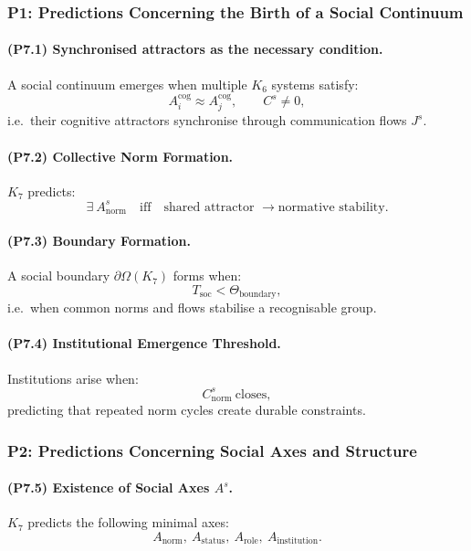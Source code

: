 \subsubsection{P1: Predictions Concerning the Birth of a Social Continuum}

\paragraph{(P7.1) Synchronised attractors as the necessary condition.}
A social continuum emerges when multiple $K_6$ systems satisfy:
\[
A_i^{\mathrm{cog}} \approx A_j^{\mathrm{cog}},
\qquad
C^s \neq 0,
\]
i.e.\ their cognitive attractors synchronise through communication flows $J^s$.

\paragraph{(P7.2) Collective Norm Formation.}
$K_7$ predicts:
\[
\exists \ A_{\mathrm{norm}}^s \quad \text{iff} \quad
\text{shared attractor } \to \text{normative stability}.
\]

\paragraph{(P7.3) Boundary Formation.}
A social boundary $\partial\Omega(K_7)$ forms when:
\[
T_{\mathrm{soc}} < \Theta_{\mathrm{boundary}},
\]
i.e.\ when common norms and flows stabilise a recognisable group.

\paragraph{(P7.4) Institutional Emergence Threshold.}
Institutions arise when:
\[
C_{\mathrm{norm}}^s \ \text{closes},
\]
predicting that repeated norm cycles create durable constraints.

\subsubsection{P2: Predictions Concerning Social Axes and Structure}

\paragraph{(P7.5) Existence of Social Axes \texorpdfstring{$A^s$}{A^s}.}
$K_7$ predicts the following minimal axes:
\[
A_{\mathrm{norm}}, \
A_{\mathrm{status}},\
A_{\mathrm{role}}, \
A_{\mathrm{institution}}.
\]

